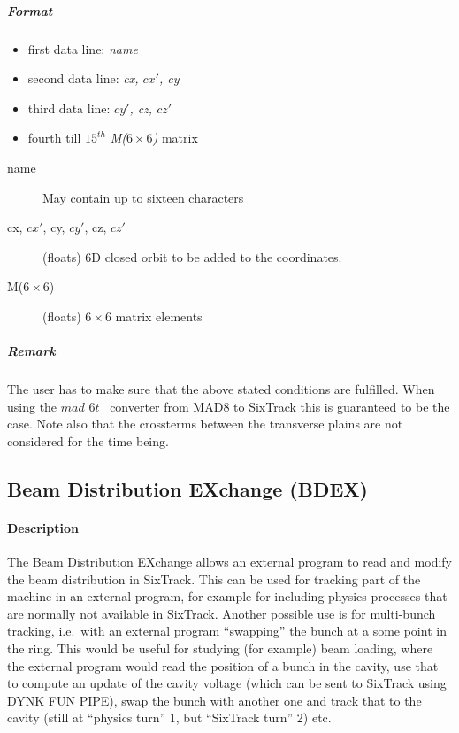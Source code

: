 \subparagraph{Format} 
\begin{itemize}
\item first data line: {\em name}
\item second data line: {\em cx, $cx'$, cy}
\item third data line: {\em $cy'$, cz, $cz'$}
\item fourth till $15^{th}$ {\em M($ 6 \times 6$)} matrix 
\end{itemize}

\begin{description}
\item [name] May contain up to sixteen characters
\item [cx, $cx'$, cy, $cy'$, cz, $cz'$] (floats) 6D closed orbit to be added
  to the coordinates.
\item [M($ 6 \times 6$)] (floats) $ 6 \times 6$ matrix elements
\end{description}

\subparagraph{Remark} The user has to make sure that the above stated
conditions are fulfilled. When using the $mad\_6t$~\cite{CONVERTOR}
converter from MAD8 to SixTrack this is guaranteed to be the case. Note
also that the crossterms between the transverse plains are not
considered for the time being.

\subsection{Beam Distribution EXchange (BDEX)}
\label{sec:BDEX}

\paragraph{Description}

The Beam Distribution EXchange allows an external program to read and modify the beam distribution in SixTrack.
This can be used for tracking part of the machine in an external program, for example for including physics processes that are normally not available in SixTrack.
Another possible use is for multi-bunch tracking, i.e.\ with an external program ``swapping'' the bunch at a some point in the ring.
This would be useful for studying (for example) beam loading, where the external program would read the position of a bunch in the cavity, use that to compute an update of the cavity voltage (which can be sent to SixTrack using DYNK FUN PIPE), swap the bunch with another one and track that to the cavity (still at ``physics turn'' 1, but ``SixTrack turn'' 2) etc.

